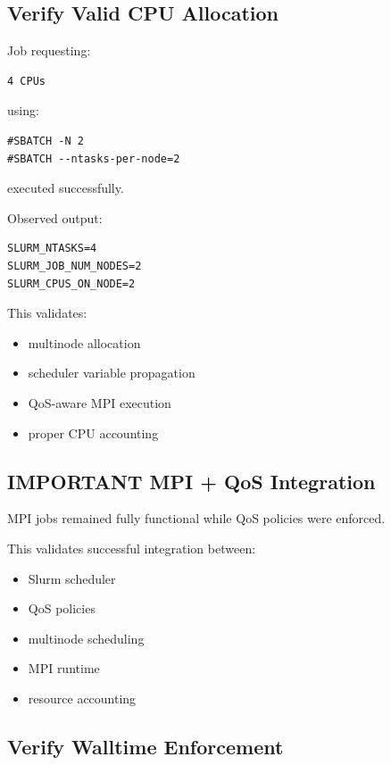 \documentclass[11pt]{article}
\begin{document}
\subsection{Verify Valid CPU Allocation}
\label{sec:org95f47e3}

Job requesting:

\begin{verbatim}
4 CPUs
\end{verbatim}

using:

\begin{verbatim}
#SBATCH -N 2
#SBATCH --ntasks-per-node=2
\end{verbatim}

executed successfully.

Observed output:

\begin{verbatim}
SLURM_NTASKS=4
SLURM_JOB_NUM_NODES=2
SLURM_CPUS_ON_NODE=2
\end{verbatim}

This validates:

\begin{itemize}
\item multinode allocation
\item scheduler variable propagation
\item QoS-aware MPI execution
\item proper CPU accounting
\end{itemize}
\subsection{IMPORTANT MPI + QoS Integration}
\label{sec:org855cf58}

MPI jobs remained fully functional while QoS policies were enforced.

This validates successful integration between:

\begin{itemize}
\item Slurm scheduler
\item QoS policies
\item multinode scheduling
\item MPI runtime
\item resource accounting
\end{itemize}
\subsection{Verify Walltime Enforcement}
\label{sec:org9bfd1eb}
\end{document}
